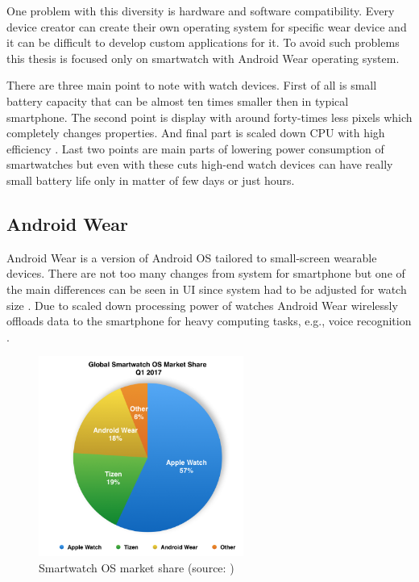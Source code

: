 One problem with this diversity is hardware and software compatibility. Every device creator can create their own operating system for specific wear device and it can be difficult to develop custom applications for it. To avoid such problems this thesis is focused only on smartwatch with Android Wear operating system. 

There are three main point to note with watch devices. First of all is small battery capacity that can be almost ten times smaller then in typical smartphone. The second point is display with around forty-times less pixels which completely changes properties. And final part is scaled down CPU with high efficiency \cite{UtCoAWO}. Last two points are main parts of lowering power consumption of smartwatches but even with these cuts high-end watch devices can have really small battery life only in matter of few days or just hours.

\subsection{Android Wear}\label{sec:AndroidWear}
Android Wear is a version of Android OS tailored to small-screen wearable devices. There are not too many changes from system for smartphone but one of the main differences can be seen in UI since system had to be adjusted for watch size \cite{CSUITW}. Due to scaled down processing power of watches Android Wear wirelessly offloads data to the smartphone for heavy computing tasks, e.g., voice recognition \cite{UCAW}.

\begin{figure}[H]
	\begin{centering}
		\includegraphics[width=0.6\textwidth]{img/wear_market_share}
		\par\end{centering}
	\caption{Smartwatch OS market share (source: \cite{TOAW})\label{fig:SmartwatchOSMarketShare}}
	\label{fig7}
\end{figure}

